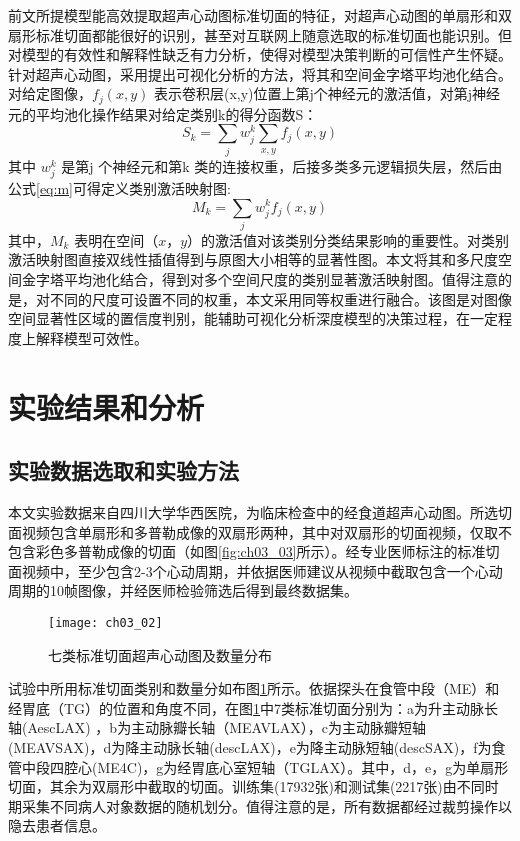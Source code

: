 前文所提模型能高效提取超声心动图标准切面的特征，对超声心动图的单扇形和双扇形标准切面都能很好的识别，甚至对互联网上随意选取的标准切面也能识别。但对模型的有效性和解释性缺乏有力分析，使得对模型决策判断的可信性产生怀疑。
针对超声心动图，采用提出可视化分析的方法，将其和空间金字塔平均池化结合。对给定图像，$f_{j}(x,y)$ 表示卷积层(x,y)位置上第j个神经元的激活值，对第j神经元的平均池化操作结果对给定类别k的得分函数S：
\begin{equation} \label{eq:s}
     S_{k}=\sum_{j}w_{j}^{k}\sum_{x,y}f_{j}(x,y)
\end{equation}	    
其中 $w_{j}^{k}$ 是第j 个神经元和第k 类的连接权重，后接多类多元逻辑损失层，然后由公式\ref{eq:m}可得定义类别激活映射图:	
  	      \begin{equation} \label{eq:m}
     M_{k}=\sum_{j}w_{j}^{k}f_{j}(x,y)
\end{equation}
其中，$M_{k}$ 表明在空间$（x，y）$的激活值对该类别分类结果影响的重要性。对类别激活映射图直接双线性插值得到与原图大小相等的显著性图。本文将其和多尺度空间金字塔平均池化结合，得到对多个空间尺度的类别显著激活映射图。值得注意的是，对不同的尺度可设置不同的权重，本文采用同等权重进行融合。该图是对图像空间显著性区域的置信度判别，能辅助可视化分析深度模型的决策过程，在一定程度上解释模型可效性。

\section{实验结果和分析}
\subsection{实验数据选取和实验方法}

本文实验数据来自四川大学华西医院，为临床检查中的经食道超声心动图。所选切面视频包含单扇形和多普勒成像的双扇形两种，其中对双扇形的切面视频，仅取不包含彩色多普勒成像的切面（如图\ref{fig:ch03_03}所示）。经专业医师标注的标准切面视频中，至少包含2-3个心动周期，并依据医师建议从视频中截取包含一个心动周期的10帧图像，并经医师检验筛选后得到最终数据集。
\begin{figure}[!htbp]
\centering
\texttt{[image: ch03\_02]}
\caption{七类标准切面超声心动图及数量分布}
\label{fig:ch03_02}
\end{figure}

试验中所用标准切面类别和数量分如布图\ref{fig:ch03_02}所示。依据探头在食管中段（ME）和经胃底（TG）的位置和角度不同，在图\ref{fig:ch03_02}中7类标准切面分别为：a为升主动脉长轴(AescLAX) ，b为主动脉瓣长轴（MEAVLAX），c为主动脉瓣短轴(MEAVSAX)，d为降主动脉长轴(descLAX)，e为降主动脉短轴(descSAX)，f为食管中段四腔心(ME4C)，g为经胃底心室短轴（TGLAX）。其中，d，e，g为单扇形切面，其余为双扇形中截取的切面。训练集(17932张)和测试集(2217张)由不同时期采集不同病人对象数据的随机划分。值得注意的是，所有数据都经过裁剪操作以隐去患者信息。
